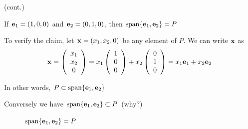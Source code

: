 \begin{frame}

    \vspace{2em}
    \Eg (cont.)
    
    If ${\mathbf e}_1 = (1,0,0)$ and ${\mathbf e}_2=(0,1,0)$, then $\operatorname{span}\{{\mathbf e}_1, {\mathbf e}_2\} = P$ 
    
   To verify the claim, let ${\mathbf x} = (x_1, x_2, 0)$ be any element of $P$. 
   We can write ${\mathbf x}$ as  
    \begin{equation*}
        {\mathbf x} = 
        \left(
        \begin{array}{c}
            x_1 \\
            x_2 \\
            0
        \end{array}
        \right)
        =
        x_1
        \left(
        \begin{array}{c}
            1 \\
            0 \\
            0
        \end{array}
        \right)
        + 
        x_2
        \left(
        \begin{array}{c}
            0 \\
            1 \\
            0
        \end{array}
        \right)
        = x_1 {\mathbf e}_1 + x_2 {\mathbf e}_2
    \end{equation*}

    In other words, $P \subset \operatorname{span}\{{\mathbf e}_1, {\mathbf e}_2\}$

    Conversely we have $\operatorname{span}\{{\mathbf e}_1, {\mathbf e}_2\} \subset P$ (why?)


\end{frame}


\begin{frame}

    \vspace{2em}
    \begin{figure}
       \begin{center}
       \end{center}
       \caption{$\operatorname{span}\{{\mathbf e}_1, {\mathbf e}_2\} = P$}
    \end{figure}


\end{frame}

